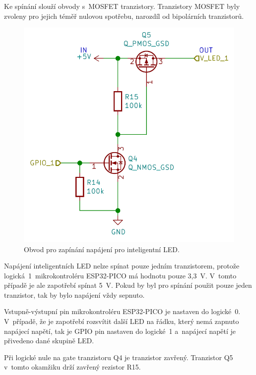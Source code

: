   Ke spínání slouží obvody s~MOSFET tranzistory. Tranzistory MOSFET byly zvoleny pro jejich téměř nulovou spotřebu, narozdíl od 
  bipolárních tranzistorů. 

  \begin{figure}[!h]
    \begin{center}
      \includegraphics[scale=0.45]{obrazky/Zapinani_napajeni_LED.png}
    \end{center}
    \caption[Obvod pro zapínání napájení pro inteligentní LED]{Obvod pro zapínání napájení pro inteligentní LED.}
  \end{figure}

  Napájení inteligentních LED nelze spínat pouze jedním tranzistorem, protože logická~1~mikrokontroléru ESP32-PICO má hodnotu pouze 3,3~V. 
  V~tomto případě je ale zapotřebí spínat 5~V. Pokud by byl pro spínání použit pouze jeden tranzistor, tak by bylo napájení vždy sepnuto.

  Vstupně-výstupní pin mikrokontroléru ESP32-PICO je nastaven do logické~0. V~případě, že je zapotřebí rozsvítit další LED na řádku, který 
  nemá zapnuto napájecí napětí, tak je GPIO pin nastaven do logické~1 a~napájecí napětí je přivedeno dané skupině LED. 
  
  Při logické nule na gate 
  tranzistoru Q4 je tranzistor zavřený. Tranzistor Q5 v~tomto okamžiku drží zavřený rezistor R15.

